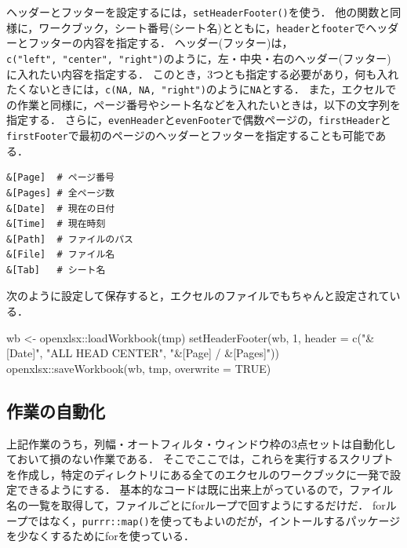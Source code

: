 \documentclass[
]{article}
\newenvironment{Shaded}{\begin{snugshade}}{\end{snugshade}}
\newcommand{\AttributeTok}[1]{\textcolor[rgb]{0.77,0.63,0.00}{#1}}
\newcommand{\ConstantTok}[1]{\textcolor[rgb]{0.00,0.00,0.00}{#1}}
\newcommand{\DecValTok}[1]{\textcolor[rgb]{0.00,0.00,0.81}{#1}}
\newcommand{\FunctionTok}[1]{\textcolor[rgb]{0.00,0.00,0.00}{#1}}
\newcommand{\NormalTok}[1]{#1}
\newcommand{\OtherTok}[1]{\textcolor[rgb]{0.56,0.35,0.01}{#1}}
\newcommand{\SpecialCharTok}[1]{\textcolor[rgb]{0.00,0.00,0.00}{#1}}
\newcommand{\StringTok}[1]{\textcolor[rgb]{0.31,0.60,0.02}{#1}}
\begin{document}
ヘッダーとフッターを設定するには，\texttt{setHeaderFooter()}を使う．
他の関数と同様に，ワークブック，シート番号(シート名)とともに，\texttt{header}と\texttt{footer}でヘッダーとフッターの内容を指定する．
ヘッダー(フッター)は，\texttt{c("left",\ "center",\ "right")}のように，左・中央・右のヘッダー(フッター)に入れたい内容を指定する．
このとき，3つとも指定する必要があり，何も入れたくないときには，\texttt{c(NA,\ NA,\ "right")}のように\texttt{NA}とする．
また，エクセルでの作業と同様に，ページ番号やシート名などを入れたいときは，以下の文字列を指定する．
さらに，\texttt{evenHeader}と\texttt{evenFooter}で偶数ページの，\texttt{firstHeader}と\texttt{firstFooter}で最初のページのヘッダーとフッターを指定することも可能である．

\begin{verbatim}
&[Page]  # ページ番号
&[Pages] # 全ページ数
&[Date]  # 現在の日付
&[Time]  # 現在時刻
&[Path]  # ファイルのパス
&[File]  # ファイル名
&[Tab]   # シート名
\end{verbatim}

次のように設定して保存すると，エクセルのファイルでもちゃんと設定されている．

\begin{Shaded}
\begin{Highlighting}[]
\NormalTok{wb }\OtherTok{\textless{}{-}}\NormalTok{ openxlsx}\SpecialCharTok{::}\FunctionTok{loadWorkbook}\NormalTok{(tmp)}
\FunctionTok{setHeaderFooter}\NormalTok{(wb, }\DecValTok{1}\NormalTok{, }\AttributeTok{header =} \FunctionTok{c}\NormalTok{(}\StringTok{"\&[Date]"}\NormalTok{, }\StringTok{"ALL HEAD CENTER"}\NormalTok{, }\StringTok{"\&[Page] / \&[Pages]"}\NormalTok{))}
\NormalTok{openxlsx}\SpecialCharTok{::}\FunctionTok{saveWorkbook}\NormalTok{(wb, tmp, }\AttributeTok{overwrite =} \ConstantTok{TRUE}\NormalTok{)}
\end{Highlighting}
\end{Shaded}

\hypertarget{ux4f5cux696dux306eux81eaux52d5ux5316}{%
\subsection{作業の自動化}\label{ux4f5cux696dux306eux81eaux52d5ux5316}}

上記作業のうち，列幅・オートフィルタ・ウィンドウ枠の3点セットは自動化しておいて損のない作業である．
そこでここでは，これらを実行するスクリプトを作成し，特定のディレクトリにある全てのエクセルのワークブックに一発で設定できるようにする．
基本的なコードは既に出来上がっているので，ファイル名の一覧を取得して，ファイルごとにforループで回すようにするだけだ．
forループではなく，\texttt{purrr::map()}を使ってもよいのだが，イントールするパッケージを少なくするためにforを使っている．
\end{document}
